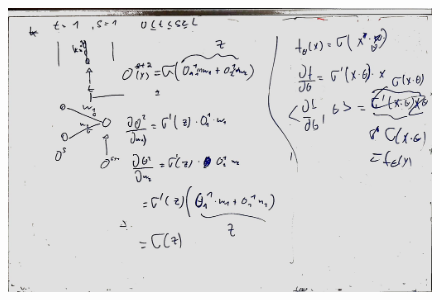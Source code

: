 \documentclass[a4paper]{article}
\begin{document}
\begin{figure}[htb]
	\centering
	\includegraphics[width=\textwidth]{whiteboard_notes/01.jpg}
\end{figure}
\end{document}
